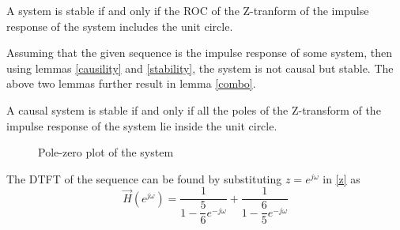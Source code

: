 \documentclass[journal,12pt,twocolumn]{IEEEtran}
\begin{document}
\begin{lemma}
A system is stable if and only if the ROC of the Z-tranform of the impulse response of the system includes the unit circle.
\label{stability}
\end{lemma}

Assuming that the given sequence is the impulse response of some system, then using lemmas \ref{causility} and \ref{stability}, the system is not causal but stable. The above two lemmas further result in lemma \ref{combo}.
\begin{lemma}
A causal system is stable if and only if all the poles of the Z-transform of the impulse response of the system lie inside the unit circle.
\label{combo}
\end{lemma}

\begin{figure}
    \centering
    \caption{Pole-zero plot of the system}
    \label{plot}
\end{figure}

The DTFT of the sequence can be found by substituting $z = e^{j\omega}$ in \ref{z} as 
\begin{equation}
    \vec{H}(e^{j\omega}) = \dfrac{1}{1-\dfrac{5}{6}e^{-j\omega}}+\dfrac{1}{1-\dfrac{6}{5}e^{-j\omega}}
\end{equation}
\end{document}
